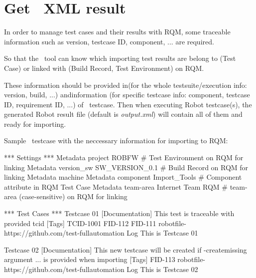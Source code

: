 



\hypertarget{description-get-robotframework-xml-result}{%
\section{Get \rfwcore\ XML result}
\label{description-get-robotframework-xml-result}}

In order to manage test cases and their results with RQM, some traceable 
information such as version, testcase ID, component, ... are required.

So that the \pkg\ tool can know which importing test results are
belong to (Test Case) or linked with (Build Record, Test Environment) on RQM.

These information should be provided in(for the whole
testsuite/execution info: version, build, ...) and\rcode{{[}Tags{]}}information 
(for specific testcase info: component, testcase ID, requirement ID, ...) of
\rfwcore\ testcase. 
Then when executing Robot testcase(s), the generated Robot result file (default 
is \emph{output.xml}) will contain all of them and ready for importing.

Sample \rfwcore\ testcase with the neccessary information for importing to RQM:

\begin{robotcode}[caption=Sample \rfwcore\ testcase,
                  linebackgroundcolor=\hlcode{2,3,4}]
*** Settings ***
Metadata   project      ROBFW             # Test Environment on RQM for linking
Metadata   version_sw   SW_VERSION_0.1    # Build Record on RQM for linking
Metadata   machine      %
Metadata   component    Import_Tools      # Component attribute in RQM Test Case
Metadata   team-area    Internet Team RQM  # team-area (case-sensitive) on RQM for linking

*** Test Cases ***
Testcase 01
   [Documentation]   This test is traceable with provided tcid
   [Tags]   TCID-1001   FID-112   FID-111    robotfile-https://github.com/test-fullautomation
   Log      This is Testcase 01

Testcase 02
   [Documentation]  This new testcase will be created if -createmissing argument
               ...  is provided when importing
   [Tags]   FID-113  robotfile-https://github.com/test-fullautomation
   Log      This is Testcase 02
\end{robotcode}

